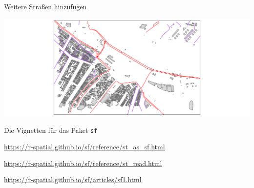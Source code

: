 \documentclass[ignorenonframetext,]{beamer}
\newenvironment{Shaded}{\begin{snugshade}}{\end{snugshade}}
\newcommand{\DataTypeTok}[1]{\textcolor[rgb]{0.13,0.29,0.53}{#1}}
\newcommand{\KeywordTok}[1]{\textcolor[rgb]{0.13,0.29,0.53}{\textbf{#1}}}
\newcommand{\NormalTok}[1]{#1}
\newcommand{\OperatorTok}[1]{\textcolor[rgb]{0.81,0.36,0.00}{\textbf{#1}}}
\newcommand{\StringTok}[1]{\textcolor[rgb]{0.31,0.60,0.02}{#1}}
\begin{document}
\begin{frame}[fragile]{Weitere Straßen hinzufügen}
\protect\hypertarget{weitere-straen-hinzufugen}{}

\begin{Shaded}
\end{Shaded}

\includegraphics{B7_simplefeatures_files/figure-beamer/unnamed-chunk-31-1.pdf}

\end{frame}

\begin{frame}{Die Vignetten für das Paket \texttt{sf}}
\protect\hypertarget{die-vignetten-fur-das-paket-sf}{}

\url{https://r-spatial.github.io/sf/reference/st_as_sf.html}

\url{https://r-spatial.github.io/sf/reference/st_read.html}

\url{https://r-spatial.github.io/sf/articles/sf1.html}

\end{frame}
\end{document}
